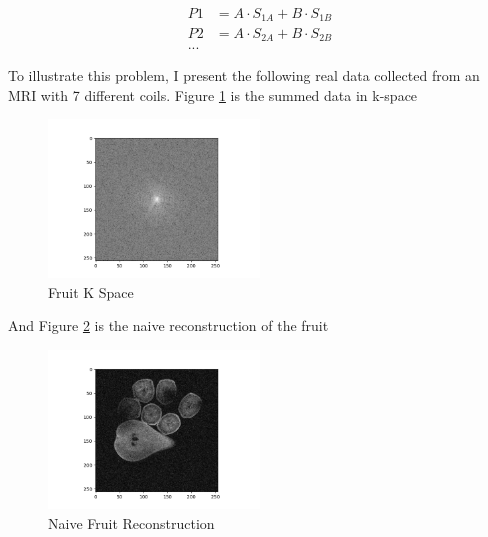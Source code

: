 \documentclass[11pt]{article}
\begin{document}
\begin{align}
P1 &= A \cdot S_{1A} + B \cdot S_{1B} \\
P2 &= A \cdot S_{2A} + B \cdot S_{2B} \\
...
\end{align}

To illustrate this problem, I present the following real data collected from
an MRI with 7 different coils. Figure \ref{fig:FruitKSpace} is the summed data in k-space

\begin{figure}[!htpb]
\centering
\includegraphics[width=0.5\textwidth]{figs/FruitKSpace.png}
\caption{\label{fig:FruitKSpace}Fruit K Space}
\end{figure}

\newpage
And Figure \ref{fig:NaiveFruit} is the naive reconstruction of the fruit
\begin{figure}[!htpb]
\centering
\includegraphics[width=0.5\textwidth]{figs/FruitNaiveReconstruction.png}
\caption{\label{fig:NaiveFruit}Naive Fruit Reconstruction}
\end{figure}
\end{document}
